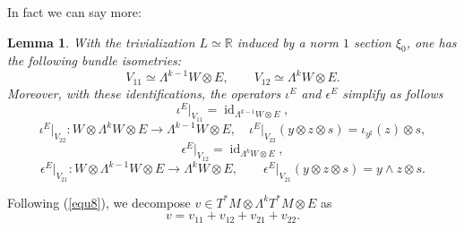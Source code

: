 \documentclass[12pt]{amsart} %
\newtheorem{lemma}[theorem]{Lemma}
\theoremstyle{definition}
\numberwithin{equation}{section}
\DeclareMathOperator{\id}{id}
\newcommand\bR{{\mathbb R}}
\newcommand{\ra}{\rightarrow}
\begin{document}
In fact we can say more:
\begin{lemma} With the trivialization $L\simeq \bR$ induced by a norm $1$ section $\xi_0$, one has the following bundle isometries:
 \[V_{11}\simeq \Lambda^{k-1}W\otimes E,\qquad V_{12}\simeq \Lambda^kW\otimes E.
 \] 
 Moreover, with these identifications, the operators $\iota^E$ and $\epsilon^E$ simplify as follows
 \begin{equation}\label{eq40}\iota^E\bigr|_{V_{11}}=\id_{\Lambda^{k-1}W\otimes E} , \end{equation}
\begin{equation}\label{eq41} \iota^E\bigr|_{V_{22}}:W\otimes \Lambda^kW\otimes E\ra \Lambda^{k-1}W\otimes E,\quad  \iota^E\bigr|_{V_{22}}(y\otimes z\otimes s)=\iota_{y^ {\sharp}}(z)\otimes s ,
\end{equation}
 \begin{equation}\label{eq4}\epsilon^E\bigr|_{V_{12}}=\id_{\Lambda^{k}W\otimes E} ,
 \end{equation} 
 \begin{equation}\label{eq42}\epsilon^E\bigr|_{V_{21}}: W\otimes  \Lambda^{k-1}W\otimes E \ra \Lambda^kW\otimes E,\qquad \epsilon^E\bigr|_{V_{21}}( y\otimes z\otimes s)= y\wedge z\otimes s .
 \end{equation} 
\end{lemma}

Following (\ref{equ8}), we  decompose $v\in T^ *M\otimes\Lambda^kT^*M\otimes E$ as
 \begin{equation}\label{equ101}v=v_{11}+v_{12}+v_{21}+v_{22}.\end{equation}
\end{document}

